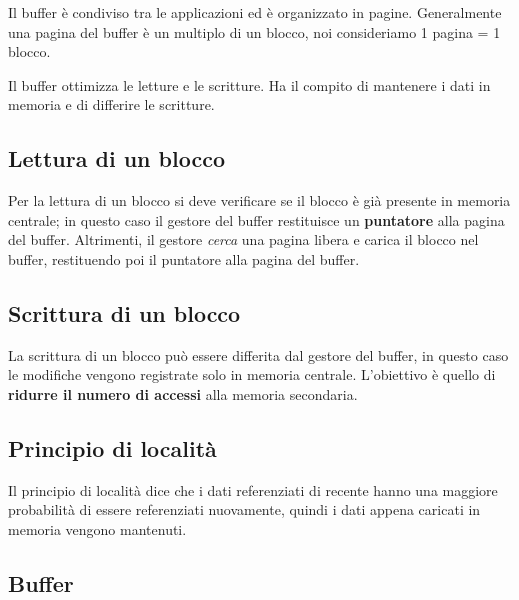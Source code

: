 \documentclass[11pt]{report}
\begin{document}
Il buffer \`e condiviso tra le applicazioni ed \`e organizzato in pagine. Generalmente una pagina del buffer \`e un multiplo di un blocco, noi consideriamo 1 pagina = 1 blocco.

Il buffer ottimizza le letture e le scritture. Ha il compito di mantenere i dati in memoria e di differire le scritture.

\subsection{Lettura di un blocco}

Per la lettura di un blocco si deve verificare se il blocco \`e gi\`a presente in memoria centrale; in questo caso il gestore del buffer restituisce un \textbf{puntatore} alla pagina del buffer.
Altrimenti, il gestore \emph{cerca} una pagina libera e carica il blocco nel buffer, restituendo poi il puntatore alla pagina del buffer.

\subsection{Scrittura di un blocco}
La scrittura di un blocco pu\`o essere differita dal gestore del buffer, in questo caso le modifiche vengono registrate solo in memoria centrale. L'obiettivo \`e quello di \textbf{ridurre il numero di accessi} alla memoria secondaria.

\subsection{Principio di localit\`a}

Il principio di localit\`a dice che i dati referenziati di recente hanno una maggiore probabilit\`a di essere referenziati nuovamente, quindi i dati appena caricati in memoria vengono mantenuti.


\subsection{Buffer}
\end{document}
